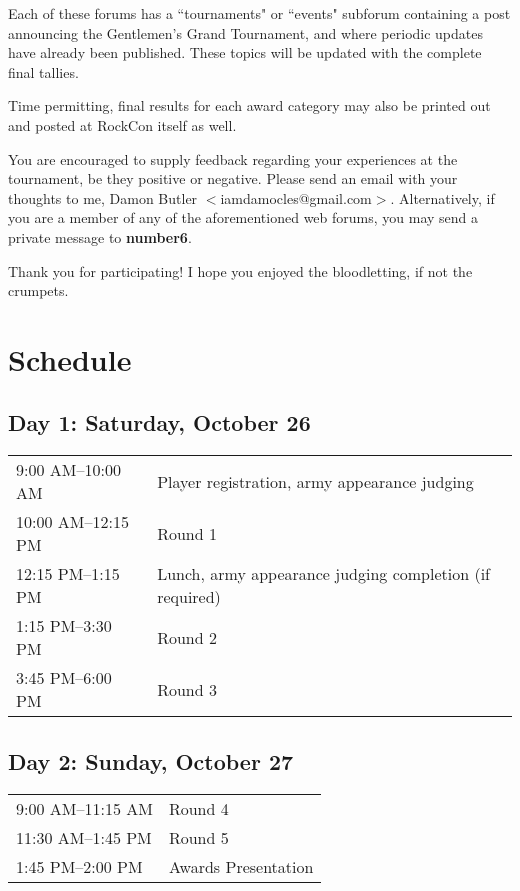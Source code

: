 \documentclass[10pt,titlepage]{article}
\begin{document}
Each of these forums has a ``tournaments" or ``events" subforum containing a post announcing the Gentlemen's Grand Tournament, and where periodic updates have already been published. These topics will be updated with the complete final tallies.

Time permitting, final results for each award category may also be printed out and posted at RockCon itself as well.

You are encouraged to supply feedback regarding your experiences at the tournament, be they positive or negative. Please send an email with your thoughts to me, Damon Butler $<$iamdamocles@gmail.com$>$. Alternatively, if you are a member of any of the aforementioned web forums, you may send a private message to \textbf{number6}.

Thank you for participating! I hope you enjoyed the bloodletting, if not the crumpets.

\section*{Schedule}

\subsection*{Day 1: Saturday, October 26}

\begin{tabular}[t]{@{}l@{\quad}l@{}}
\phantom{1}9:00 AM--10:00 AM & Player registration, army appearance judging \\
10:00 AM--12:15 PM & Round 1 \\
12:15 PM--\phantom{1}1:15 PM & Lunch, army appearance judging completion (if required) \\
\phantom{1}1:15 PM--\phantom{1}3:30 PM & Round 2 \\
\phantom{1}3:45 PM--\phantom{1}6:00 PM &  Round 3 \\
\end{tabular}

\subsection*{Day 2: Sunday, October 27}

\begin{tabular}[t]{@{}l@{\quad}l@{}}
\phantom{1}9:00 AM--11:15 AM & Round 4 \\
11:30 AM--\phantom{1}1:45 PM & Round 5 \\
\phantom{1}1:45 PM--\phantom{1}2:00 PM & Awards Presentation \\
\end{tabular}
\end{document}
